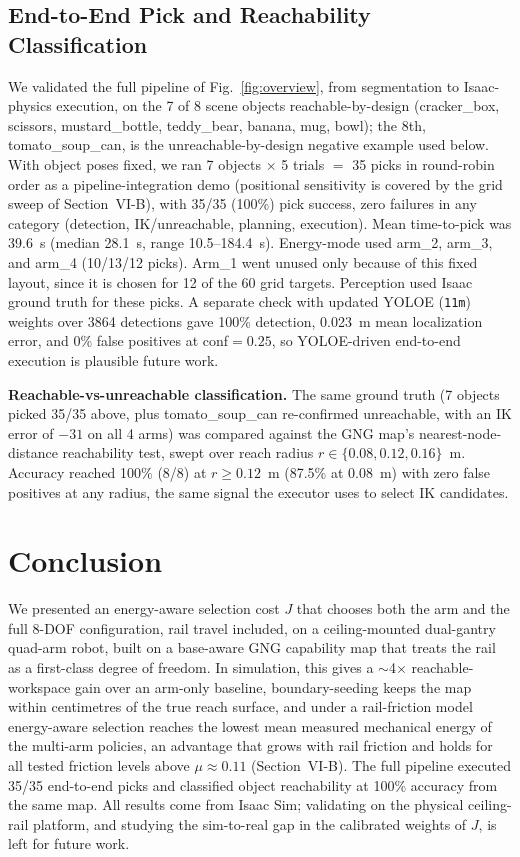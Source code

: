 \documentclass[conference]{IEEEtran}
\begin{document}
\subsection{End-to-End Pick and Reachability Classification}
We validated the full pipeline of Fig.~\ref{fig:overview}, from segmentation to
Isaac-physics execution, on the 7 of 8 scene objects reachable-by-design
(cracker\_box, scissors, mustard\_bottle, teddy\_bear, banana, mug, bowl); the
8th, tomato\_soup\_can, is the unreachable-by-design negative example used below.
With object poses fixed, we ran 7 objects $\times$ 5 trials $=$ 35 picks in
round-robin order as a pipeline-integration demo (positional sensitivity is covered
by the grid sweep of Section~VI-B), with 35/35 (100\%) pick success, zero failures in any category (detection,
IK/unreachable, planning, execution). Mean time-to-pick was 39.6~s (median 28.1~s,
range 10.5--184.4~s). Energy-mode used arm\_2, arm\_3, and arm\_4 (10/13/12 picks). Arm\_1 went unused
only because of this fixed layout, since it is chosen for 12 of the 60 grid targets.
Perception used Isaac ground truth for these picks. A separate check with updated
YOLOE (\texttt{11m}) weights over 3864 detections gave 100\% detection, 0.023~m
mean localization error, and 0\% false positives at conf$=0.25$, so YOLOE-driven
end-to-end execution is plausible future work.

\textbf{Reachable-vs-unreachable classification.} The same ground truth (7
objects picked 35/35 above, plus tomato\_soup\_can re-confirmed unreachable, with an IK
error of $-31$ on all 4 arms) was compared against the GNG map's
nearest-node-distance reachability test, swept over
reach radius $r\in\{0.08,0.12,0.16\}$~m. Accuracy reached 100\%
(8/8) at $r\geq0.12$~m (87.5\% at 0.08~m) with zero false positives at any radius, the same
signal the executor uses to select IK candidates.

\section{Conclusion}

We presented an energy-aware selection cost $J$ that chooses both
the arm and the full 8-DOF configuration, rail travel included, on a
ceiling-mounted dual-gantry quad-arm robot, built on a base-aware GNG capability
map that treats the rail as a first-class degree of freedom. In simulation, this
gives a $\sim$4$\times$ reachable-workspace gain over an arm-only baseline,
boundary-seeding keeps the map within centimetres of the true reach surface, and
under a rail-friction
model energy-aware selection reaches the lowest mean measured mechanical energy of
the multi-arm policies, an advantage that
grows with rail friction and holds for all tested friction levels above
$\mu\approx0.11$ (Section~VI-B). The
full pipeline executed 35/35 end-to-end picks and classified object reachability
at 100\% accuracy from the same map. All results come from Isaac Sim; validating on the physical
ceiling-rail platform, and studying the sim-to-real gap in the calibrated weights
of $J$, is left for future work.
\end{document}
